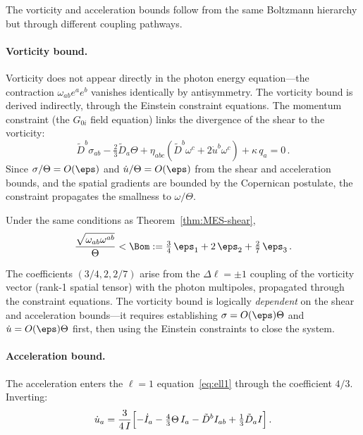 The vorticity and acceleration bounds follow from the same
Boltzmann hierarchy but through different coupling pathways.

\paragraph{Vorticity bound.}
Vorticity does not appear directly in the photon energy
equation---the contraction $\omega_{ab}e^a e^b$ vanishes
identically by antisymmetry.  The vorticity bound is derived
indirectly, through the Einstein constraint equations.  The
momentum constraint (the $G_{0i}$ field equation) links the
divergence of the shear to the vorticity:
\begin{equation}\label{eq:momentum-constraint}
\tilde{D}^b\sigma_{ab} - \tfrac{2}{3}\tilde{D}_a\Theta
+ \eta_{abc}(\tilde{D}^b\omega^c + 2\dot{u}^b\omega^c)
+ \kappa\,q_a = 0\,.
\end{equation}
Since $\sigma/\Theta = O(\eps)$ and $\dot{u}/\Theta = O(\eps)$
from the shear and acceleration bounds, and the spatial gradients
are bounded by the Copernican postulate, the constraint
propagates the smallness to $\omega/\Theta$.

\begin{theorem}\label{thm:MES-omega}
Under the same conditions as Theorem~\ref{thm:MES-shear},
\begin{equation}\label{eq:Bom-def}
\frac{\sqrt{\omega_{ab}\omega^{ab}}}{\Theta}
< \Bom
:= \tfrac{3}{4}\,\eps_1 + 2\,\eps_2 + \tfrac{2}{7}\,\eps_3\,.
\end{equation}
\end{theorem}

The coefficients $(3/4, 2, 2/7)$ arise from the $\Delta\ell =
\pm 1$ coupling of the vorticity vector (rank-1 spatial tensor)
with the photon multipoles, propagated through the constraint
equations.  The vorticity bound is logically \emph{dependent}
on the shear and acceleration bounds---it requires establishing
$\sigma = O(\eps)\Theta$ and $\dot{u} = O(\eps)\Theta$ first,
then using the Einstein constraints to close the system.

\paragraph{Acceleration bound.}
The acceleration enters the $\ell = 1$
equation~\eqref{eq:ell1} through the coefficient $4/3$.
Inverting:
\begin{equation}\label{eq:udot-from-ell1}
\dot{u}_a = \frac{3}{4\,I}\Bigl[
  -\dot{I}_a - \tfrac{4}{3}\Theta\,I_a
  - \tilde{D}^b I_{ab}
  + \tfrac{1}{3}\tilde{D}_a I
\Bigr]\,.
\end{equation}


